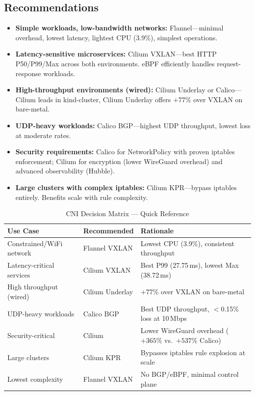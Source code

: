 \documentclass[11pt,a4paper]{article}
\begin{document}
\subsection{Recommendations}

\begin{resultbox}
\begin{itemize}
  \item \textbf{Simple workloads, low-bandwidth networks:} Flannel---minimal overhead, lowest latency, lightest CPU (3.9\%), simplest operations.
  \item \textbf{Latency-sensitive microservices:} Cilium VXLAN---best HTTP P50/P99/Max across both environments. eBPF efficiently handles request-response workloads.
  \item \textbf{High-throughput environments (wired):} Cilium Underlay or Calico---Cilium leads in kind-cluster, Cilium Underlay offers $+77\%$ over VXLAN on bare-metal.
  \item \textbf{UDP-heavy workloads:} Calico BGP---highest UDP throughput, lowest loss at moderate rates.
  \item \textbf{Security requirements:} Calico for NetworkPolicy with proven iptables enforcement; Cilium for encryption (lower WireGuard overhead) and advanced observability (Hubble).
  \item \textbf{Large clusters with complex iptables:} Cilium KPR---bypass iptables entirely. Benefits scale with rule complexity.
\end{itemize}
\end{resultbox}

\begin{table}[H]
\centering
\caption{CNI Decision Matrix --- Quick Reference}
\begin{tabular}{p{3.8cm}p{3cm}p{6cm}}
  \toprule
  \textbf{Use Case} & \textbf{Recommended} & \textbf{Rationale} \\
  \midrule
  Constrained/WiFi network & Flannel VXLAN & Lowest CPU (3.9\%), consistent throughput \\
  Latency-critical services & Cilium VXLAN & Best P99 (27.75\,ms), lowest Max (38.72\,ms) \\
  High throughput (wired) & Cilium Underlay & +77\% over VXLAN on bare-metal \\
  UDP-heavy workloads & Calico BGP & Best UDP throughput, $<$0.15\% loss at 10\,Mbps \\
  Security-critical & Cilium & Lower WireGuard overhead ($+365\%$ vs.\ $+537\%$ Calico) \\
  Large clusters & Cilium KPR & Bypasses iptables rule explosion at scale \\
  Lowest complexity & Flannel VXLAN & No BGP/eBPF, minimal control plane \\
  \bottomrule
\end{tabular}
\label{tab:decision-matrix}
\end{table}
\end{document}
